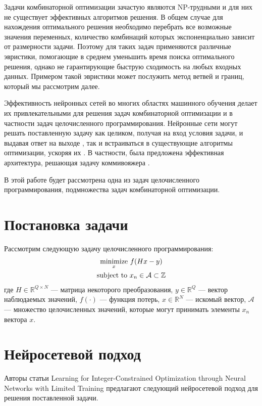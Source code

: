 \documentclass[12pt]{article}
\begin{document}
Задачи комбинаторной оптимизации зачастую являются NP-трудными и для них не существует эффективных алгоритмов решения. В общем случае для нахождения оптимального решения необходимо перебрать все возможные значения переменных, количество комбинаций которых экспоненциально зависит от размерности задачи. Поэтому для таких задач применяются различные эвристики, помогающие в среднем уменьшить время поиска оптимального решения, однако не гарантирующие быструю сходимость на любых входных данных. Примером такой эвристики может послужить метод ветвей и границ, который мы рассмотрим далее.

Эффективность нейронных сетей во многих областях машинного обучения делает их привлекательными для решения задач комбинаторной оптимизации и в частности задач целочисленного программирования. Нейронные сети могут решать поставленную задачу как целиком, получая на вход условия задачи, и выдавая ответ на выходе \cite{https://doi.org/10.48550/arxiv.1506.03134, https://doi.org/10.48550/arxiv.2011.05399}, так и встраиваться в существующие алгоритмы оптимизации, ускоряя их \cite{https://doi.org/10.48550/arxiv.2012.13349}. В частности, была предложена эффективная архитектура, решающая задачу коммивояжера \cite{https://doi.org/10.48550/arxiv.1506.03134}.

В этой работе будет рассмотрена одна из задач целочисленного программирования, подмножества задач комбинаторной оптимизации.

\section{Постановка задачи}

Рассмотрим следующую задачу целочисленного программирования:
$$
\begin{gathered}
    {\operatornamewithlimits{minimize}_x} \ f(Hx - y) \\
    \text{subject to} \ x_n \in \mathcal{A} \subset \mathbb{Z}
\end{gathered}
$$
где $H \in \mathbb{R}^{Q \times N}$ — матрица некоторого преобразования, $y \in \mathbb{R}^Q$ — вектор наблюдаемых значений, $f(\cdot)$ — функция потерь, $x \in \mathbb{R}^N$ — искомый вектор, $\mathcal{A}$ — множество целочисленных значений, которые могут принимать элементы $x_n$ вектора $x$.




\section{Нейросетевой подход}
Авторы статьи Learning for Integer-Constrained Optimization through Neural Networks with Limited Training \cite{https://doi.org/10.48550/arxiv.2011.05399} предлагают следующий нейросетевой подход для решения поставленной задачи.
\end{document}
